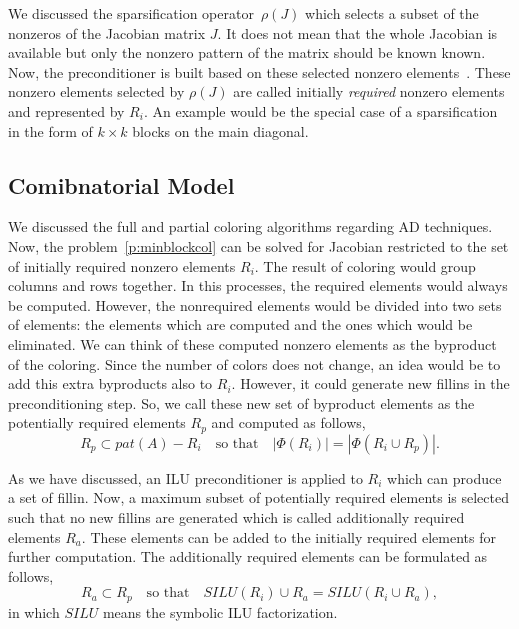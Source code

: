 \documentclass[12pt, oneside]{book}
\newcommand{\sparsifysymbol}{\ensuremath{\rho}}
\newcommand{\sparsify}[1]{\ensuremath{\sparsifysymbol(#1)}}
\begin{document}
We discussed the sparsification operator~\sparsify{J} 
which selects a subset of the nonzeros of the Jacobian matrix $J$. 
It does not mean that the whole Jacobian is available but 
only the nonzero pattern of the matrix should be known known.
Now, the preconditioner is built based on these selected nonzero elements~\cite{Cullum2006}.
These nonzero elements selected by \sparsify{J} are called initially 
\emph{required} nonzero elements and represented by $R_i$. 
An example would be the special case of a sparsification in the form of $k\times k$
blocks on the main diagonal.
\subsection{Comibnatorial Model}
We discussed the full and partial coloring algorithms regarding AD techniques. 
Now, the problem~\ref{p:minblockcol} can be solved for Jacobian
restricted to the set of initially
required nonzero elements $R_i$. The result of coloring would group
columns and rows together. In this processes, the required elements would always
be computed. However, the nonrequired elements would be divided into two sets of
elements: the elements which are computed and the ones which would be 
eliminated. We can think of these computed nonzero elements as the byproduct
of the coloring. Since the number of colors does not change, 
an idea would be to add this extra byproducts also to $R_i$.
However, it could generate new fillins in the preconditioning step.
So, we call these new set of byproduct elements as the potentially
required elements $R_p$ and computed as follows,
$$
R_p \subset pat(A) - R_i \quad\text{so that}\quad |\Phi(R_i)| = |\Phi(R_i\cup R_p)|.
$$ 

As we have discussed, an ILU preconditioner is applied to $R_i$ which can
produce a set of fillin. Now, a maximum subset of potentially required elements
is selected such that no new fillins are generated which is called
additionally required elements $R_a$. These elements can be added to the
initially required elements for further computation. 
The additionally required elements can be formulated as follows,
$$
R_a \subset R_p \quad\text{so that}\quad SILU(R_i) \cup R_a = SILU(R_i\cup R_a),
$$ 
in which $SILU$ means the symbolic ILU factorization.
\end{document}

